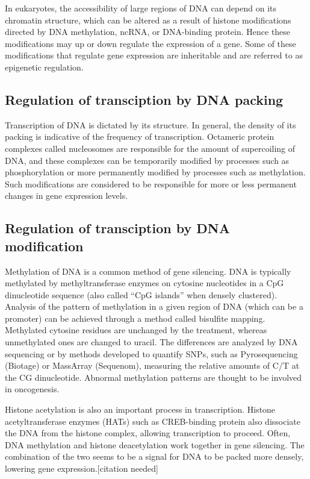 In eukaryotes, the accessibility of large regions of DNA can depend on its chromatin structure, which can be altered as a result of histone modifications directed by DNA methylation, ncRNA, or DNA-binding protein. Hence these modifications may up or down regulate the expression of a gene. Some of these modifications that regulate gene expression are inheritable and are referred to as epigenetic regulation.

\hypertarget{regulation-of-transciption-by-dna-packing}{%
\subsection{Regulation of transciption by DNA packing}\label{regulation-of-transciption-by-dna-packing}}

Transcription of DNA is dictated by its structure. In general, the density of its packing is indicative of the frequency of transcription. Octameric protein complexes called nucleosomes are responsible for the amount of supercoiling of DNA, and these complexes can be temporarily modified by processes such as phosphorylation or more permanently modified by processes such as methylation. Such modifications are considered to be responsible for more or less permanent changes in gene expression levels.

\hypertarget{regulation-of-transciption-by-dna-modification}{%
\subsection{Regulation of transciption by DNA modification}\label{regulation-of-transciption-by-dna-modification}}

Methylation of DNA is a common method of gene silencing. DNA is typically methylated by methyltransferase enzymes on cytosine nucleotides in a CpG dinucleotide sequence (also called ``CpG islands'' when densely clustered). Analysis of the pattern of methylation in a given region of DNA (which can be a promoter) can be achieved through a method called bisulfite mapping. Methylated cytosine residues are unchanged by the treatment, whereas unmethylated ones are changed to uracil. The differences are analyzed by DNA sequencing or by methods developed to quantify SNPs, such as Pyrosequencing (Biotage) or MassArray (Sequenom), measuring the relative amounts of C/T at the CG dinucleotide. Abnormal methylation patterns are thought to be involved in oncogenesis.

Histone acetylation is also an important process in transcription. Histone acetyltransferase enzymes (HATs) such as CREB-binding protein also dissociate the DNA from the histone complex, allowing transcription to proceed. Often, DNA methylation and histone deacetylation work together in gene silencing. The combination of the two seems to be a signal for DNA to be packed more densely, lowering gene expression.{[}citation needed{]}


